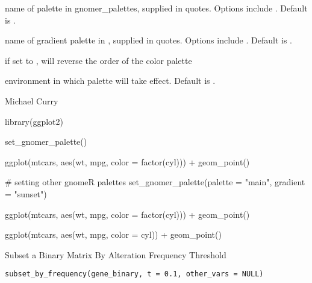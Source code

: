 \documentclass[a4paper]{book}
\begin{document}
\begin{Arguments}
\begin{ldescription}
\item[\code{palette}] name of palette in gnomer\_palettes, supplied in quotes.
Options include .
Default is .

\item[\code{gradient}] name of gradient palette in , supplied in quotes.
Options include . Default is .

\item[\code{reverse}] if set to , will reverse the order of the color palette

\item[\code{env}] environment in which palette will take effect. Default is .
\end{ldescription}
\end{Arguments}
%
\begin{Author}\relax
Michael Curry
\end{Author}
%
\begin{Examples}
\begin{ExampleCode}
library(ggplot2)

set_gnomer_palette()

ggplot(mtcars, aes(wt, mpg, color = factor(cyl))) +
  geom_point()

# setting other gnomeR palettes
set_gnomer_palette(palette = "main", gradient = "sunset")

ggplot(mtcars, aes(wt, mpg, color = factor(cyl))) +
  geom_point()

ggplot(mtcars, aes(wt, mpg, color = cyl)) +
  geom_point()
\end{ExampleCode}
\end{Examples}
%
\begin{Description}\relax
Subset a Binary Matrix By Alteration Frequency Threshold
\end{Description}
%
\begin{Usage}
\begin{verbatim}
subset_by_frequency(gene_binary, t = 0.1, other_vars = NULL)
\end{verbatim}
\end{Usage}
%
\end{document}
